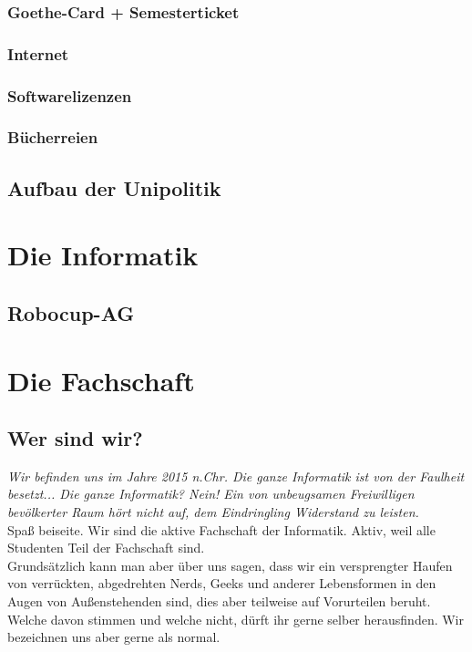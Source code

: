 \documentclass[12pt,a4paper]{article}
\begin{document}
		\subsubsection{Goethe-Card + Semesterticket}
		\subsubsection{Internet}
		\subsubsection{Softwarelizenzen}
		\subsubsection{Bücherreien}
	\subsection{Aufbau der Unipolitik}
\section{Die Informatik}
	\subsection{Robocup-AG}
\section{Die Fachschaft}
	\subsection{Wer sind wir?}
		\glqq\textit{ Wir befinden uns im Jahre 2015 n.Chr. Die ganze Informatik ist von der Faulheit besetzt... Die ganze Informatik? Nein! Ein von unbeugsamen Freiwilligen bevölkerter Raum hört nicht auf, dem Eindringling  Widerstand zu leisten.} \grqq \\
		Spaß beiseite. Wir sind die aktive Fachschaft der Informatik. Aktiv, weil alle Studenten Teil der Fachschaft sind. \\
		Grundsätzlich kann man aber über uns sagen, dass wir ein versprengter Haufen von verrückten, abgedrehten Nerds, Geeks und anderer Lebensformen in den Augen von Außenstehenden sind, dies aber teilweise auf Vorurteilen  
	beruht. Welche davon stimmen und welche nicht, dürft ihr gerne selber herausfinden. Wir bezeichnen uns aber gerne als normal. 	
\end{document}

